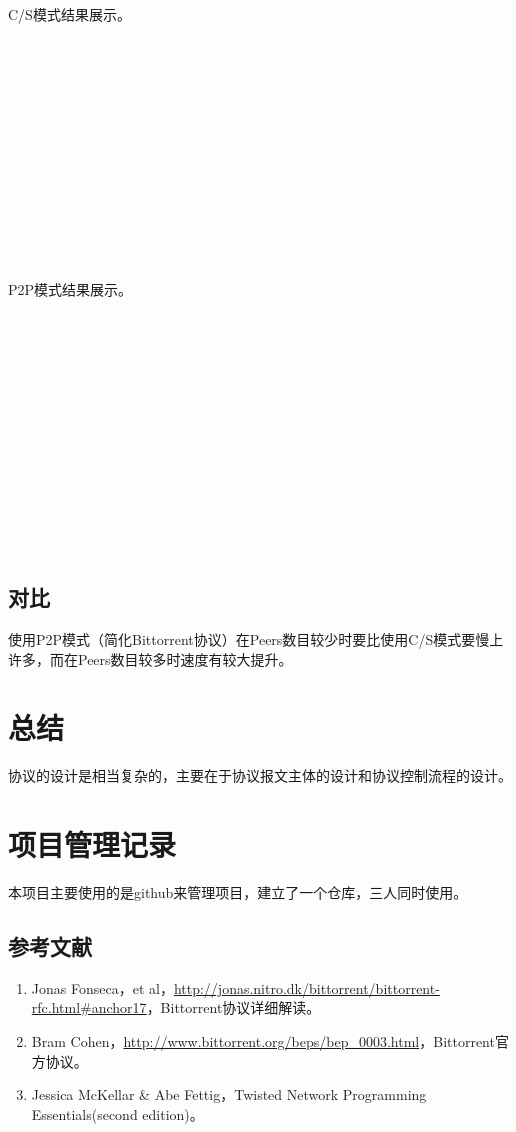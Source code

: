 \documentclass[15pt]{ctexart}
\begin{document}
\\
\\
	C/S模式结果展示。
\\
\\
\\
\\
\\
\\
\\
\\
\\
\\
\\
\\
\\
\\
	P2P模式结果展示。
\\
\\
\\
\\
\\
\\
\\
\\
\\
\\
\\
\\
\\
\\
\subsection{对比} %
\label{sub:对比}
	使用P2P模式（简化Bittorrent协议）在Peers数目较少时要比使用C/S模式要慢上许多，而在Peers数目较多时速度有较大提升。

\section{总结} %
\label{sec:总结}
	协议的设计是相当复杂的，主要在于协议报文主体的设计和协议控制流程的设计。

\section{项目管理记录} %
\label{sec:项目管理记录}
	本项目主要使用的是github来管理项目，建立了一个仓库，三人同时使用。

\newpage
\appendixpage
\begin{appendices}
	\section{参考文献} %
	\begin{enumerate}
		\item Jonas Fonseca，et al，\url{http://jonas.nitro.dk/bittorrent/bittorrent-rfc.html#anchor17}，Bittorrent协议详细解读。
		\item Bram Cohen，\url{http://www.bittorrent.org/beps/bep_0003.html}，Bittorrent官方协议。
		\item Jessica McKellar & Abe Fettig，Twisted Network Programming Essentials(second edition)。
	\end{enumerate}
\end{appendices}
\end{document}
